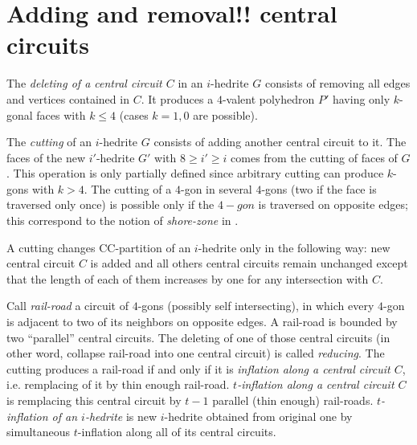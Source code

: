 \documentclass[12pt]{article}
\begin{document}
\section{Adding and removal!! central circuits}


%
%
%
%
%


The {\em deleting of a central circuit $C$} in an $i$-hedrite $G$ consists 
of removing all edges and vertices contained in $C$. It produces a 
$4$-valent polyhedron $P'$ having only $k$-gonal faces 
with $k \leq 4$ (cases $k=1,0$ are possible).


The {\em cutting} of an $i$-hedrite $G$ consists of adding another central 
circuit to it. The faces of the new $i'$-hedrite $G'$ with $8\geq i'\geq i$ 
comes from the cutting of faces of $G$. This operation is only partially
defined since arbitrary cutting can produce $k$-gons with $k>4$. The 
cutting of a $4$-gon in several $4$-gons (two if the face
is traversed only once) is possible only if the $4-gon$ is traversed 
on opposite edges; this correspond to the notion of {\it shore-zone} 
in \cite{DSt}.


A cutting changes CC-partition of an $i$-hedrite only in the following 
way: new central circuit $C$ is added and all others central circuits 
remain unchanged except that the length of each of them increases by one 
for any intersection with $C$. 


Call {\em rail-road} a circuit of $4$-gons (possibly self intersecting), 
in which every $4$-gon is adjacent to two of its neighbors on opposite
edges. A rail-road is bounded by two ``parallel'' central circuits.
The deleting of  one of those central circuits (in other word, collapse 
rail-road into one central circuit) is called {\em reducing}.
The cutting produces a rail-road if and only if it is {\em inflation 
along a central circuit $C$}, i.e. remplacing of it by thin enough 
rail-road. {\em $t$-inflation along a central circuit $C$} is remplacing
this central circuit by $t-1$ parallel (thin enough) rail-roads.
{\em $t$-inflation of an $i$-hedrite} is new $i$-hedrite
obtained from original one by simultaneous $t$-inflation along all
of its central circuits. 
\end{document}
